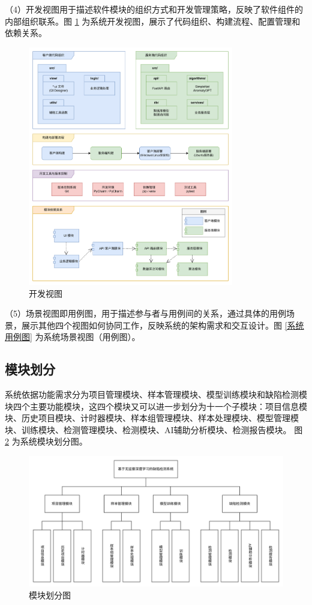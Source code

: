 \documentclass[
  ]{njuthesis}
\begin{document}
（4）开发视图用于描述软件模块的组织方式和开发管理策略，反映了软件组件的内部组织联系。图 \ref{开发视图} 为系统开发视图，展示了代码组织、构建流程、配置管理和依赖关系。

\begin{figure}[H]
    \centering
    \includegraphics[width=0.8\textwidth]{images/开发视图.png}
    \caption{开发视图}
    \label{开发视图}
\end{figure}

（5）场景视图即用例图，用于描述参与者与用例间的关系，通过具体的用例场景，展示其他四个视图如何协同工作，反映系统的架构需求和交互设计。图 \ref{系统用例图} 为系统场景视图（用例图）。

\subsection{模块划分}

系统依据功能需求分为项目管理模块、样本管理模块、模型训练模块和缺陷检测模块四个主要功能模块，这四个模块又可以进一步划分为十一个子模块：项目信息模块、历史项目模块、计时器模块、样本组管理模块、样本处理模块、模型管理模块、训练模块、检测管理模块、检测模块、AI辅助分析模块、检测报告模块。
图 \ref{模块划分图} 为系统模块划分图。

\begin{figure}[htb]
    \centering
    \includegraphics[width=\textwidth]{images/模块划分图.png}
    \caption{模块划分图}
    \label{模块划分图}
\end{figure}
\end{document}
